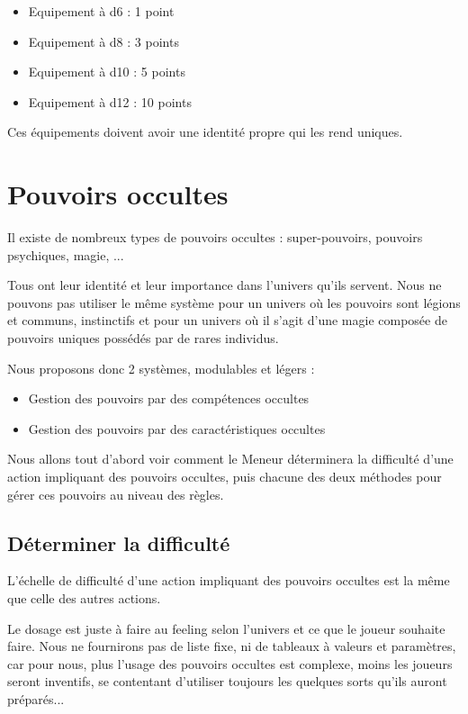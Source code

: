 \documentclass{conf/FusinaClass}
\begin{document}
\begin{itemize}
\item Equipement à d6 : 1 point
\item Equipement à d8 : 3 points
\item Equipement à d10 : 5 points
\item Equipement à d12 : 10 points
\end{itemize}

Ces équipements doivent avoir une identité propre qui les rend uniques.


\part{Pouvoirs occultes}
Il existe de nombreux types de pouvoirs occultes : super-pouvoirs, pouvoirs psychiques, magie, ...

Tous ont leur identité et leur importance dans l'univers qu'ils servent. Nous ne pouvons pas utiliser le même système pour un univers où les pouvoirs sont légions et communs, instinctifs et pour un univers où il s'agit d'une magie composée de pouvoirs uniques possédés par de rares individus.

Nous proposons donc 2 systèmes, modulables et légers :

\begin{itemize}
\item Gestion des pouvoirs par des compétences occultes
\item Gestion des pouvoirs par des caractéristiques occultes
\end{itemize}

Nous allons tout d'abord voir comment le Meneur déterminera la difficulté d'une action impliquant des pouvoirs occultes, puis chacune des deux méthodes pour gérer ces pouvoirs au niveau des règles.

\chapter{Déterminer la difficulté}
L'échelle de difficulté d'une action impliquant des pouvoirs occultes est la même que celle des autres actions. 

Le dosage est juste à faire au feeling selon l'univers et ce que le joueur souhaite faire. Nous ne fournirons pas de liste fixe, ni de tableaux à valeurs et paramètres, car pour nous, plus l'usage des pouvoirs occultes est complexe, moins les joueurs seront inventifs, se contentant d'utiliser toujours les quelques sorts qu'ils auront préparés...
\end{document}
